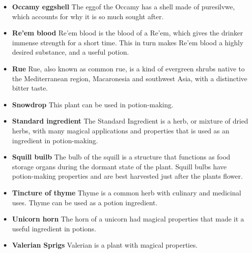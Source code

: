 \begin{itemize}
 \item \textbf {Occamy eggshell}
The eggof the Occamy has a shell made of puresilvwe, which accounts for why it is so much sought after.

 \item \textbf {Re'em blood}
Re'em blood is the blood of a Re'em, which gives the drinker immense strength for a short time. This in turn makes Re'em blood a highly desired substance, and a useful potion.

 \item \textbf {Rue}
Rue, also known as common rue, is a kind of evergreen shrubs native to the Mediterranean region, Macaronesia and southwest Asia, with a distinctive bitter taste.

 \item \textbf {Snowdrop}
This plant can be used in potion-making.

 \item \textbf {Standard ingredient}
The Standard Ingredient is a herb, or mixture of dried herbs, with many magical applications and properties that is used as an ingredient in potion-making. 

 \item \textbf {Squill builb}
The bulb of the squill is a structure that functions as food storage organs during the dormant state of the plant. Squill bulbs have potion-making properties and are best harvested just after the plants flower.

 \item \textbf {Tincture of thyme}
Thyme is a common herb with culinary and medicinal uses. Thyme can be used as a potion ingredient.

 \item \textbf {Unicorn horn}
The horn of a unicorn had magical properties that made it a useful ingredient in potions.

 \item \textbf {Valerian Sprigs}
 Valerian is a plant with magical properties.
 \end{itemize}
    

